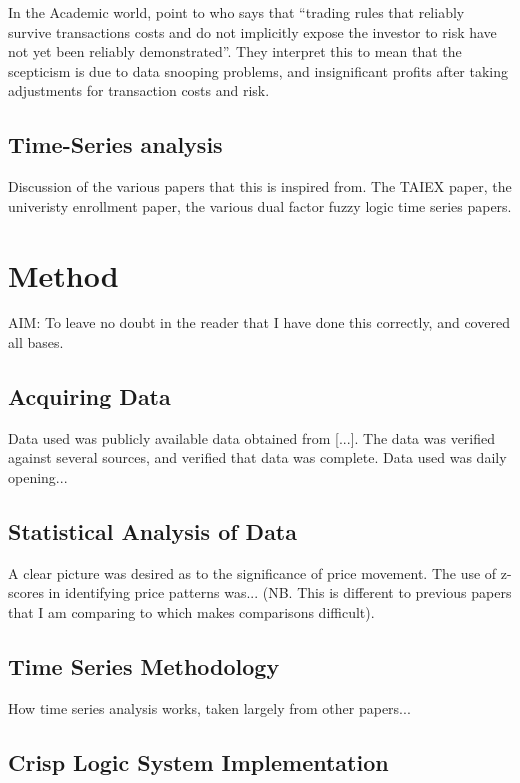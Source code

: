 \documentclass{article}
\begin{document}
In the Academic world, \cite{taprofitability} point to \cite{assetpricing} who says that ``trading rules that reliably survive transactions costs and do not implicitly expose the investor to risk have not yet been reliably demonstrated''. They interpret this to mean that the scepticism is due to data snooping problems, and insignificant profits after taking adjustments for transaction costs and risk.

\subsection{Time-Series analysis}

Discussion of the various papers that this is inspired from. The TAIEX paper, the univeristy enrollment paper,  the various dual factor fuzzy logic time series papers.

\section{Method}

AIM: To leave no doubt in the reader that I have done this correctly, and covered all bases.

\subsection{Acquiring Data}

Data used was publicly available data obtained from [...]. The data was verified against several sources, and verified that data was complete. Data used was daily opening...

\subsection{Statistical Analysis of Data}

A clear picture was desired as to the significance of price movement. The use of z-scores in identifying price patterns was... (NB. This is different to previous papers that I am comparing to which makes comparisons difficult).

\subsection{Time Series Methodology}

How time series analysis works, taken largely from other papers...

\subsection{Crisp Logic System Implementation}
\end{document}
